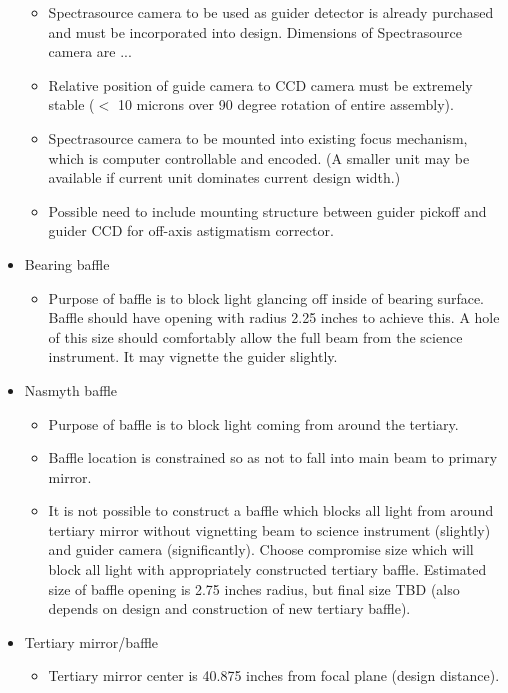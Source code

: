 \documentclass{report}[12pt]
\begin{document}
\begin{itemize}
\begin{itemize}
\item Spectrasource camera to be used as guider detector is already
purchased and must be incorporated into design. Dimensions of Spectrasource
camera are ...

\item Relative position of guide camera to CCD camera must be extremely
stable ($<$ 10 microns over 90 degree rotation of entire assembly).

\item Spectrasource camera to be mounted into existing focus mechanism,
which is computer controllable and encoded. (A smaller unit may be available
if current unit dominates current design width.)

\item Possible need to include mounting structure between guider pickoff
and guider CCD for off-axis astigmatism corrector.
\end{itemize}

\item Bearing baffle
\begin{itemize}
\item Purpose of baffle is to block light glancing off inside of bearing
surface. Baffle should have opening with radius 2.25 inches to achieve
this. A hole of this size should comfortably allow the full beam from the
science instrument. It may vignette the guider slightly.

\end{itemize}

\item Nasmyth baffle
\begin{itemize}
\item Purpose of baffle is to block light coming from around the tertiary.

\item Baffle location is constrained so as not to fall into main beam to
primary mirror. 

\item It is not possible to construct a baffle which blocks all light from
around tertiary mirror without vignetting beam to science instrument (slightly)
and guider camera (significantly). Choose compromise size which will 
block all light with appropriately constructed tertiary baffle. Estimated
size of baffle opening is 2.75 inches radius, but final size TBD (also
depends on design and construction of new tertiary baffle).
\end{itemize}

\item Tertiary mirror/baffle
\begin{itemize}
\item Tertiary mirror center is 40.875 inches from focal plane (design
distance).


\end{itemize}
\end{itemize}
\end{document}
